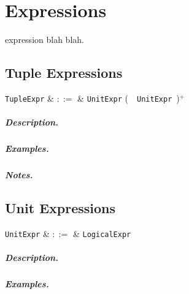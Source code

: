 \chapter{Expressions}
\Gls{expression} blah blah.


\section{Tuple Expressions}

\begin{syntax}
  \verb+TupleExpr+ & $::=$ & \verb+UnitExpr+ \big(\ \token{,}\ \verb+UnitExpr+\ \big)$^+$ \\
\end{syntax}

\paragraph{Description.}

\paragraph{Examples.}

\paragraph{Notes.} 


\section{Unit Expressions}

\begin{syntax}
  \verb+UnitExpr+ & $::=$ & \verb+LogicalExpr+\\
\end{syntax}

\paragraph{Description.}

\paragraph{Examples.}

